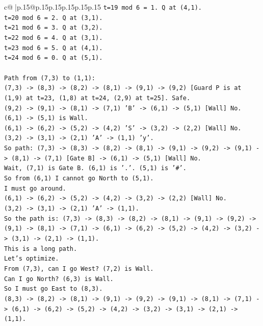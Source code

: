 \documentclass{article}
\begin{document}
{\begin{supertabular}{c@{$\;$}|p{.15\linewidth}@{}p{.15\linewidth}p{.15\linewidth}p{.15\linewidth}p{.15\linewidth}p{.15\linewidth}}
{{{\texttt{t=19 mod 6 = 1. Q at (4,1).} \\
\texttt{t=20 mod 6 = 2. Q at (3,1).} \\
\texttt{t=21 mod 6 = 3. Q at (3,2).} \\
\texttt{t=22 mod 6 = 4. Q at (3,1).} \\
\texttt{t=23 mod 6 = 5. Q at (4,1).} \\
\texttt{t=24 mod 6 = 0. Q at (5,1).} \\
\\ 
\texttt{Path from (7,3) to (1,1):} \\
\texttt{(7,3) {-}> (8,3) {-}> (8,2) {-}> (8,1) {-}> (9,1) {-}> (9,2) {[}Guard P is at (1,9) at t=23, (1,8) at t=24, (2,9) at t=25{]}. Safe.} \\
\texttt{(9,2) {-}> (9,1) {-}> (8,1) {-}> (7,1) 'B' {-}> (6,1) {-}> (5,1) {[}Wall{]} No.} \\
\texttt{(6,1) {-}> (5,1) is Wall.} \\
\texttt{(6,1) {-}> (6,2) {-}> (5,2) {-}> (4,2) 'S' {-}> (3,2) {-}> (2,2) {[}Wall{]} No.} \\
\texttt{(3,2) {-}> (3,1) {-}> (2,1) 'A' {-}> (1,1) 'y'.} \\
\texttt{So path: (7,3) {-}> (8,3) {-}> (8,2) {-}> (8,1) {-}> (9,1) {-}> (9,2) {-}> (9,1) {-}> (8,1) {-}> (7,1) {[}Gate B{]} {-}> (6,1) {-}> (5,1) {[}Wall{]} No.} \\
\texttt{Wait, (7,1) is Gate B. (6,1) is '.'. (5,1) is '\#'.} \\
\texttt{So from (6,1) I cannot go North to (5,1).} \\
\texttt{I must go around.} \\
\texttt{(6,1) {-}> (6,2) {-}> (5,2) {-}> (4,2) {-}> (3,2) {-}> (2,2) {[}Wall{]} No.} \\
\texttt{(3,2) {-}> (3,1) {-}> (2,1) 'A' {-}> (1,1).} \\
\texttt{So the path is: (7,3) {-}> (8,3) {-}> (8,2) {-}> (8,1) {-}> (9,1) {-}> (9,2) {-}> (9,1) {-}> (8,1) {-}> (7,1) {-}> (6,1) {-}> (6,2) {-}> (5,2) {-}> (4,2) {-}> (3,2) {-}> (3,1) {-}> (2,1) {-}> (1,1).} \\
\texttt{This is a long path.} \\
\texttt{Let's optimize.} \\
\texttt{From (7,3), can I go West? (7,2) is Wall.} \\
\texttt{Can I go North? (6,3) is Wall.} \\
\texttt{So I must go East to (8,3).} \\
\texttt{(8,3) {-}> (8,2) {-}> (8,1) {-}> (9,1) {-}> (9,2) {-}> (9,1) {-}> (8,1) {-}> (7,1) {-}> (6,1) {-}> (6,2) {-}> (5,2) {-}> (4,2) {-}> (3,2) {-}> (3,1) {-}> (2,1) {-}> (1,1).} \\
}}}
\end{supertabular}}
\end{document}
